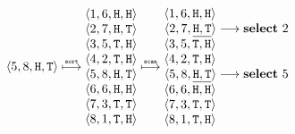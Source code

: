 \begin{align*}
\begin{matrix}
    \langle 5, 8, \text{\tt H}, \text{\tt T} \rangle \\
  \end{matrix}
  \stackrel{\text{\tiny \tt sort}}{\longmapsto}
  \begin{matrix}
    \langle 1, 6, \text{\tt H}, \text{\tt H} \rangle \\
    \langle 2, 7, \text{\tt H}, \text{\tt T} \rangle \\
    \langle 3, 5, \text{\tt T}, \text{\tt H} \rangle \\
    \langle 4, 2, \text{\tt T}, \text{\tt H} \rangle \\
    \langle 5, 8, \text{\tt H}, \text{\tt T} \rangle \\
    \langle 6, 6, \text{\tt H}, \text{\tt H} \rangle \\
    \langle 7, 3, \text{\tt T}, \text{\tt T} \rangle \\
    \langle 8, 1, \text{\tt T}, \text{\tt H} \rangle \\
  \end{matrix}
  \stackrel{\text{\tiny \tt scan}}{\longmapsto}
  \begin{matrix}
    \langle 1, 6, \text{\tt H}, \text{\tt H} \rangle \phantom{\longrightarrow \text{\bf select}\ 2\ }\\
    \langle 2, 7, \underline{\text{\tt H}, \text{\tt T}} \rangle \longrightarrow \text{\bf select}\ 2\\
    \langle 3, 5, \text{\tt T}, \text{\tt H} \rangle \phantom{\longrightarrow \text{\bf select}\ 2\ }\\
    \langle 4, 2, \text{\tt T}, \text{\tt H} \rangle \phantom{\longrightarrow \text{\bf select}\ 2\ }\\
    \langle 5, 8, \underline{\text{\tt H}, \text{\tt T}} \rangle \longrightarrow \text{\bf select}\ 5\\
    \langle 6, 6, \text{\tt H}, \text{\tt H} \rangle \phantom{\longrightarrow \text{\bf select}\ 2\ }\\
    \langle 7, 3, \text{\tt T}, \text{\tt T} \rangle \phantom{\longrightarrow \text{\bf select}\ 2\ }\\
    \langle 8, 1, \text{\tt T}, \text{\tt H} \rangle \phantom{\longrightarrow \text{\bf select}\ 2\ }\\
  \end{matrix}
\end{align*}
%
